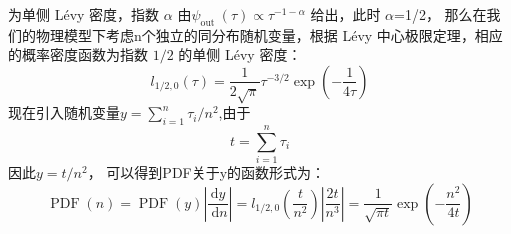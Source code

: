 为单侧  L$\textrm{\'{e}}$vy  密度，指数  $\alpha$  由$\psi_{\text {out }}(\tau) \propto \tau^{-1-\alpha}$ 给出，此时  $\alpha$=1/2，
那么在我们的物理模型下考虑n个独立的同分布随机变量，根据  L$\textrm{\'{e}}$vy  中心极限定理\cite{metzlerRandomWalkGuide2000}，相应的概率密度函数为指数  $1/2$  的单侧  L$\textrm{\'{e}}$vy  密度：\begin{equation}
l_{1 / 2,0}(\tau)=\frac{1}{2 \sqrt{\pi}} \tau^{-3 / 2} \exp \left(-\frac{1}{4 \tau}\right)
\end{equation}
现在引入随机变量$y=\sum_{i=1}^{n} \tau_{i} / n^{2}$,由于
\begin{equation}
t=\sum_{i=1}^{n} \tau_{i}
\end{equation}
因此$y=t / n^{2}$，
可以得到PDF关于y的函数形式为：
\begin{equation}\label{PDFjiang}
\operatorname{PDF}(n)=\operatorname{PDF}(y)\left|\frac{\mathrm{d} y}{\mathrm{~d} n}\right|=
l_{1 / 2,0}\left(\frac{t}{n^{2}}\right)\left|\frac{2 t}{n^{3}}\right|=\frac{1}{\sqrt{\pi t}} \exp \left(-\frac{n^{2}}{4 t}\right)
\end{equation} 